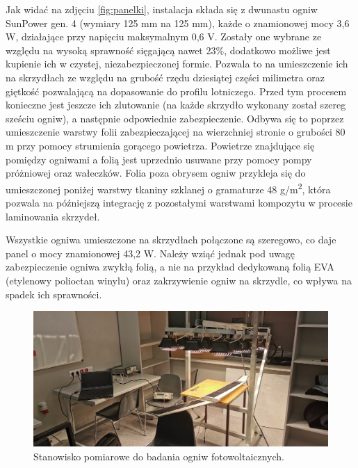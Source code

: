 \documentclass[12pt, a4paper]{article}
\begin{document}
Jak widać na zdjęciu \ref{fig:panelki}, instalacja składa się z dwunastu ogniw SunPower gen. 4 (wymiary 125 mm na 125 mm), każde o znamionowej mocy 3,6 W, działające przy napięciu maksymalnym 0,6 V. Zostały one wybrane ze względu na wysoką sprawność sięgającą nawet 23\%,  dodatkowo możliwe jest kupienie ich w czystej, niezabezpieczonej formie. Pozwala to na umieszczenie ich na skrzydłach ze względu na grubość rzędu dziesiątej części milimetra oraz giętkość pozwalającą na dopasowanie do profilu lotniczego. Przed tym procesem konieczne jest jeszcze ich zlutowanie (na każde skrzydło wykonany został szereg sześciu ogniw), a następnie odpowiednie zabezpieczenie. Odbywa się to poprzez umieszczenie warstwy folii  zabezpieczającej na wierzchniej stronie o grubości 80 \textmugreek m przy pomocy strumienia gorącego powietrza. Powietrze znajdujące się pomiędzy ogniwami a folią jest uprzednio usuwane przy pomocy pompy próżniowej oraz wałeczków. Folia poza obrysem ogniw przykleja się do umieszczonej poniżej warstwy tkaniny szklanej o gramaturze 48 g/m\textsuperscript{2}, która pozwala na późniejszą integrację z pozostałymi warstwami kompozytu w procesie laminowania skrzydeł.

Wszystkie ogniwa umieszczone na skrzydłach połączone są szeregowo, co daje panel o mocy znamionowej 43,2 W. Należy wziąć jednak pod uwagę zabezpieczenie ogniwa zwykłą folią, a nie na przykład dedykowaną folią EVA (etylenowy polioctan winylu) oraz zakrzywienie ogniw na skrzydle, co wpływa na spadek ich sprawności.

\begin{figure}[ht]
    \centering
    \includegraphics[width=1\textwidth]{badania}
    \caption{Stanowisko pomiarowe do badania ogniw fotowoltaicznych.}
    \label{fig:badanie}
\end{figure}
\end{document}
